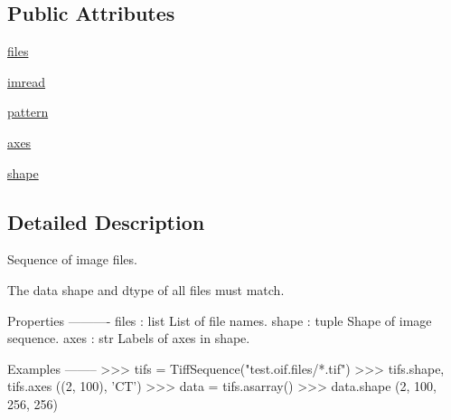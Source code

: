 \subsection*{Public Attributes}
\begin{DoxyCompactItemize}
\item 
\hyperlink{classtifffile_1_1_tiff_sequence_a734d6dfdbfbdc2d26c59e7413e9f78d4}{files}
\item 
\hyperlink{classtifffile_1_1_tiff_sequence_a656d87f405cb67c7744470bef749c09d}{imread}
\item 
\hyperlink{classtifffile_1_1_tiff_sequence_a3ced8e56728d8dc84b95cd0e28dd8b29}{pattern}
\item 
\hyperlink{classtifffile_1_1_tiff_sequence_af80218f30eebb11ff3054df126b5e800}{axes}
\item 
\hyperlink{classtifffile_1_1_tiff_sequence_ae581d8715f29b3c6d03df21d139d68c9}{shape}
\end{DoxyCompactItemize}


\subsection{Detailed Description}
\begin{DoxyVerb}Sequence of image files.

The data shape and dtype of all files must match.

Properties
----------
files : list
    List of file names.
shape : tuple
    Shape of image sequence.
axes : str
    Labels of axes in shape.

Examples
--------
>>> tifs = TiffSequence("test.oif.files/*.tif")
>>> tifs.shape, tifs.axes
((2, 100), 'CT')
>>> data = tifs.asarray()
>>> data.shape
(2, 100, 256, 256)\end{DoxyVerb}
 

